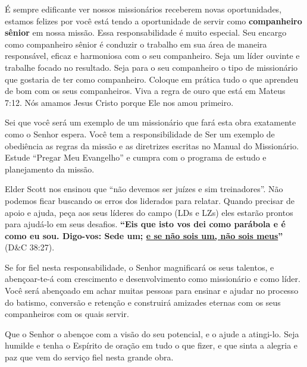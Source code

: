 \'E sempre edificante ver nossos mission\'arios receberem novas oportunidades, estamos felizes por voc\^e est\'a tendo a oportunidade de servir como \textbf{companheiro s\^enior} em nossa miss\~ao. Essa responsabilidade \'e muito especial. Seu encargo como companheiro s\^enior \'e conduzir o trabalho em sua \'area de maneira respons\'avel, eficaz e harmoniosa com o seu companheiro. Seja um l\'ider ouvinte e trabalhe focado no resultado. Seja para o seu companheiro o tipo de mission\'ario que gostaria de ter como companheiro. Coloque em pr\'atica tudo o que aprendeu de bom com os seus companheiros. Viva a regra de ouro que est\'a em Mateus 7:12. N\'os amamos Jesus Cristo porque Ele nos amou primeiro.

Sei que voc\^e ser\'a um exemplo de um mission\'ario que far\'a esta obra exatamente como o Senhor espera. Voc\^e tem a responsibilidade de Ser um exemplo de obedi\^encia as regras da miss\~ao e as diretrizes escritas no Manual do Mission\'ario. Estude ``Pregar Meu Evangelho'' e cumpra com o programa de estudo e planejamento da miss\~ao.

Elder Scott nos ensinou que ``n\~ao devemos ser ju\'izes e sim treinadores''. N\~ao podemos ficar buscando os erros dos liderados para relatar. Quando precisar de apoio e ajuda, pe\c ca aos seus l\'ideres do campo (LDs e LZs) eles estar\~ao prontos para ajud\'a-lo em seus desafios. \textbf{``Eis que isto vos dei como par\'abola e \'e como eu sou. Digo-vos: Sede um; \underline{e se n\~ao sois um, n\~ao sois meus}''} (D\&C 38:27).

Se for fiel nesta responsabilidade, o Senhor magnificar\'a os seus talentos, e aben\c coar-te-\'a com crescimento e desenvolvimento como mission\'ario e como l\'ider. Voc\^e ser\'a aben\c coado em achar muitas pessoas para ensinar e ajudar no processo do batismo, convers\~ao e reten\c c\~ao e construir\'a amizades eternas com os seus companheiros com os quais servir.

Que o Senhor o aben\c coe com a vis\~ao do seu potencial, e o ajude a atingi-lo. Seja humilde e tenha o Esp\'irito de ora\c c\~ao em tudo o que fizer, e que sinta a alegria e paz que vem do servi\c co fiel nesta grande obra.
